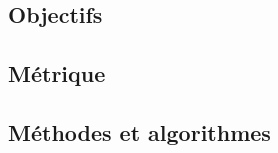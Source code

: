 \subsection{Objectifs}
\label{sec:ch6_objASSR}


\subsection{Métrique}
\label{sec:ch6_metriqueASSR}

\subsection{Méthodes et algorithmes}
\label{sec:ch6_algoASSR}








